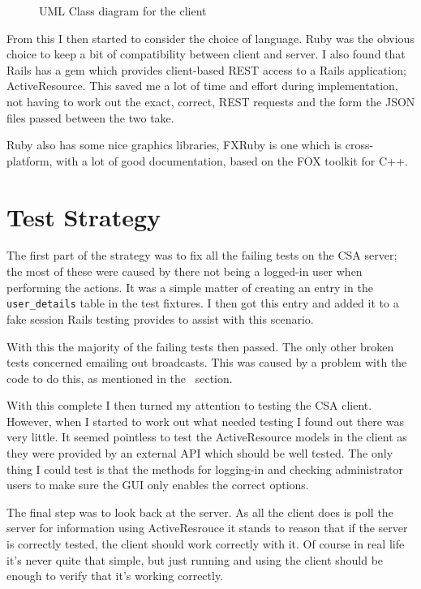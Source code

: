 \documentclass{article}
\begin{document}
\begin{figure}[h]
\caption{UML Class diagram for the client}
\label{fig:client-uml-class}
\end{figure}

From this I then started to consider the choice of language. Ruby was the obvious choice
to keep a bit of compatibility between client and server. I also found that Rails has a
gem which provides client-based REST access to a Rails application; ActiveResource. This
saved me a lot of time and effort during implementation, not having to work out the 
exact, correct, REST requests and the form the JSON files passed between the two take.

Ruby also has some nice graphics libraries, FXRuby is one which is cross-platform, with a
lot of good documentation, based on the FOX toolkit for C++.

\clearpage
\section{Test Strategy}
The first part of the strategy was to fix all the failing tests on the CSA server; the 
most of these were caused by there not being a logged-in user when performing the 
actions. It was a simple matter of creating an entry in the \verb$user_details$ table in
the test fixtures. I then got this entry and added it to a fake session Rails testing
provides to assist with this scenario.\cite{buren07}

With this the majority of the failing tests then passed. The only other broken tests
concerned emailing out broadcasts. This was caused by a problem with the code to do this,
as mentioned in the ~section.

With this complete I then turned my attention to testing the CSA client. However, when
I started to work out what needed testing I found out there was very little. It seemed
pointless to test the ActiveResource models in the client as they were provided by an
external API which should be well tested. The only thing I could test is that the methods
for logging-in and checking administrator users to make sure the GUI only enables the
correct options.

The final step was to look back at the server. As all the client does is poll the server
for information using ActiveResrouce it stands to reason that if the server is correctly
tested, the client should work correctly with it. Of course in real life it's never quite
that simple, but just running and using the client should be enough to verify that it's
working correctly.
\end{document}
